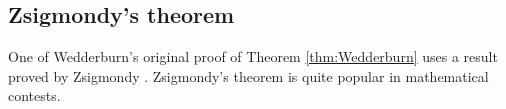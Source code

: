 




\subsection{Zsigmondy's theorem}

One of Wedderburn's original proof of Theorem \ref{thm:Wedderburn} 
uses a 
result proved
by Zsigmondy \cite{MR1546236}. Zsigmondy's theorem is 
quite popular in mathematical contests. 

